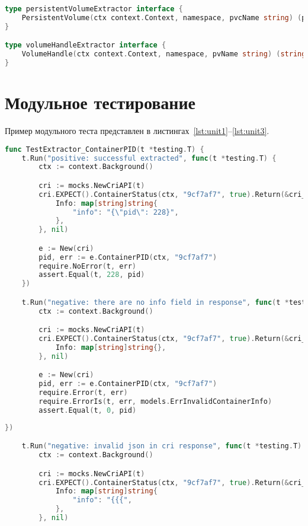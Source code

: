 \begin{appendices}
\begin{lstlisting}[language=Go,label=lst:podiolimit_gen7, caption={Генерация PodIOLimit (продолжение листинга~\ref{lst:podiolimit_gen6})}]
type persistentVolumeExtractor interface {
	PersistentVolume(ctx context.Context, namespace, pvcName string) (pvName, provisioner string, err error)
}

type volumeHandleExtractor interface {
	VolumeHandle(ctx context.Context, namespace, pvName string) (string, error)
}
\end{lstlisting}

\chapter{Модульное тестирование}

Пример модульного теста представлен в листингах~\ref{lst:unit1}--\ref{lst:unit3}.

\begin{lstlisting}[language=Go,label=lst:unit1, caption={Модульный тест}]
func TestExtractor_ContainerPID(t *testing.T) {
	t.Run("positive: successful extracted", func(t *testing.T) {
		ctx := context.Background()

		cri := mocks.NewCriAPI(t)
		cri.EXPECT().ContainerStatus(ctx, "9cf7af7", true).Return(&cri_api.ContainerStatusResponse{
			Info: map[string]string{
				"info": "{\"pid\": 228}",
			},
		}, nil)

		e := New(cri)
		pid, err := e.ContainerPID(ctx, "9cf7af7")
		require.NoError(t, err)
		assert.Equal(t, 228, pid)
	})

	t.Run("negative: there are no info field in response", func(t *testing.T) {
		ctx := context.Background()

		cri := mocks.NewCriAPI(t)
		cri.EXPECT().ContainerStatus(ctx, "9cf7af7", true).Return(&cri_api.ContainerStatusResponse{
			Info: map[string]string{},
		}, nil)

		e := New(cri)
		pid, err := e.ContainerPID(ctx, "9cf7af7")
		require.Error(t, err)
		require.ErrorIs(t, err, models.ErrInvalidContainerInfo)
		assert.Equal(t, 0, pid)
\end{lstlisting}

\begin{lstlisting}[language=Go,label=lst:unit2, caption={Модульный тест (продолжение листинга~\ref{lst:unit1})}]
	})

	t.Run("negative: invalid json in cri response", func(t *testing.T) {
		ctx := context.Background()

		cri := mocks.NewCriAPI(t)
		cri.EXPECT().ContainerStatus(ctx, "9cf7af7", true).Return(&cri_api.ContainerStatusResponse{
			Info: map[string]string{
				"info": "{{{",
			},
		}, nil)


\end{lstlisting}
\end{appendices}
